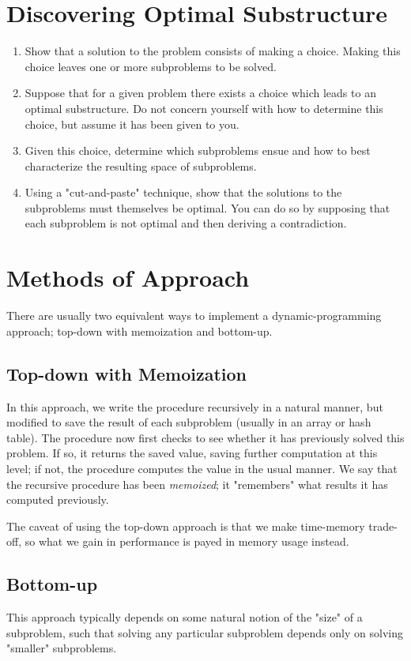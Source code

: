 \section{Discovering Optimal Substructure}
\begin{enumerate}
	\item Show that a solution to the problem consists of making a choice.
Making this choice leaves one or more subproblems to be solved.
	\item Suppose that for a given problem there exists a choice which leads
to an optimal substructure. Do not concern yourself with how to determine this
choice, but assume it has been given to you.
	\item Given this choice, determine which subproblems ensue and how to best
characterize the resulting space of subproblems.
	\item Using a "cut-and-paste" technique, show that the solutions to the
subproblems must themselves be optimal. You can do so by supposing that each
subproblem is not optimal and then deriving a contradiction.
\end{enumerate}

\section{Methods of Approach}
There are usually two equivalent ways to implement a dynamic-programming
approach; top-down with memoization and bottom-up.

\subsection{Top-down with Memoization}
In this approach, we write the procedure recursively in a natural manner, but
modified to save the result of each subproblem (usually in an array or hash
table). The procedure now first checks to see whether it has previously solved
this problem. If so, it returns the saved value, saving further computation at
this level; if not, the procedure computes the value in the usual manner. We
say that the recursive procedure has been \textit{memoized}; it "remembers"
what results it has computed previously.

The caveat of using the top-down approach is that we make time-memory
trade-off, so what we gain in performance is payed in memory usage instead.

\subsection{Bottom-up}
This approach typically depends on some natural notion of the "size" of a
subproblem, such that solving any particular subproblem depends only on
solving "smaller" subproblems.

